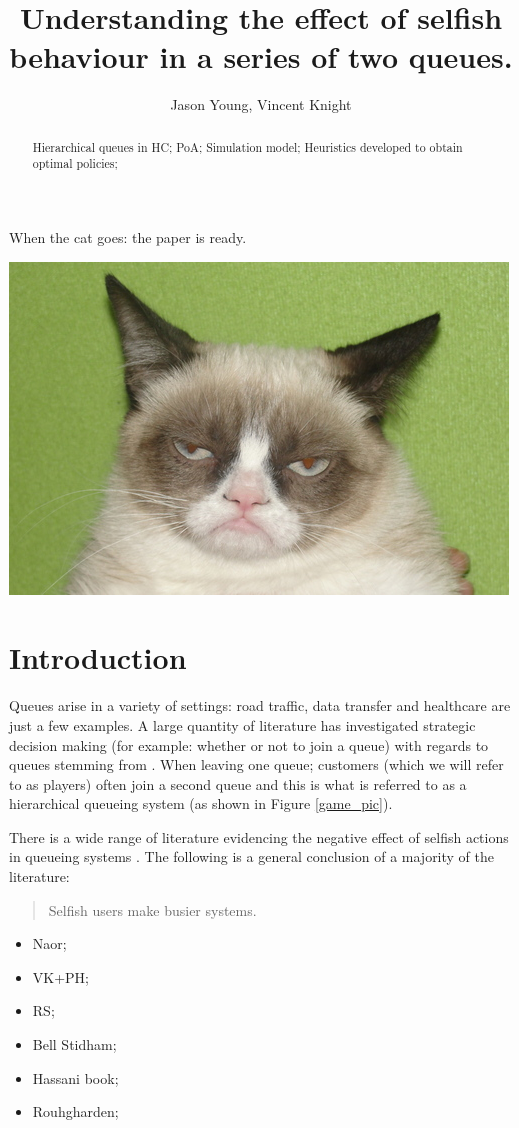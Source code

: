 \documentclass[12pt]{article}
\title{Understanding the effect of selfish behaviour in a series of two queues.}
\author{Jason Young, Vincent Knight}
\begin{document}
When the cat goes: the paper is ready.

\begin{center}
  \includegraphics[width=.5\textwidth]{Images/cat.jpg}
\end{center}

\maketitle

\begin{abstract}

Hierarchical queues in HC;
PoA;
Simulation model;
Heuristics developed to obtain optimal policies;

\end{abstract}

\section{Introduction}\label{Introduction}

Queues arise in a variety of settings: road traffic, data transfer and healthcare are just a few examples.
A large quantity of literature has investigated strategic decision making (for example: whether or not to join a queue) with regards to queues stemming from \cite{}.
When leaving one queue; customers (which we will refer to as players) often join a second queue and this is what is referred to as a hierarchical queueing system (as shown in Figure \ref{game_pic}).

There is a wide range of literature evidencing the negative effect of selfish actions in queueing systems \cite{}.
The following is a general conclusion of a majority of the literature:

\begin{quote}
Selfish users make busier systems.
\end{quote}

\begin{itemize}
    \item Naor;
    \item VK+PH;
    \item RS;
    \item Bell Stidham;
    \item Hassani book;
    \item Rouhgharden;
\end{itemize}
\end{document}
